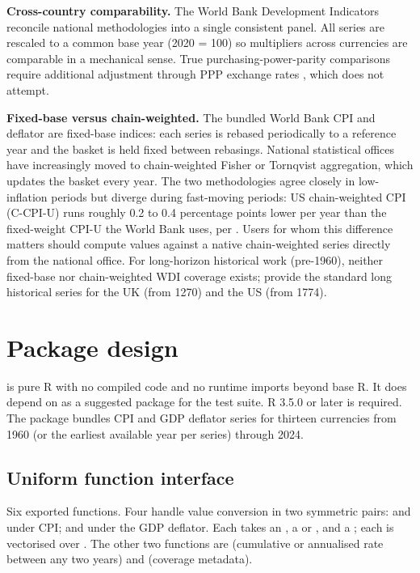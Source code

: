 \textbf{Cross-country comparability.} The World Bank Development
Indicators reconcile national methodologies into a single
consistent panel. All series are rescaled to a common base year
(2020 = 100) so multipliers across currencies are comparable in a
mechanical sense. True purchasing-power-parity comparisons require
additional adjustment through PPP exchange rates
\citep{deaton2010price}, which  does not attempt.

\textbf{Fixed-base versus chain-weighted.} The bundled World Bank CPI
and deflator are fixed-base indices: each series is rebased
periodically to a reference year and the basket is held fixed
between rebasings. National statistical offices have increasingly
moved to chain-weighted Fisher or Tornqvist aggregation, which
updates the basket every year. The two methodologies agree closely
in low-inflation periods but diverge during fast-moving periods:
US chain-weighted CPI (C-CPI-U) runs roughly 0.2 to 0.4 percentage
points lower per year than the fixed-weight CPI-U the World Bank
uses, per \citet{moulton2018measurement}. Users for whom this difference
matters should compute values against a native chain-weighted
series directly from the national office. For long-horizon
historical work (pre-1960), neither fixed-base nor chain-weighted
WDI coverage exists; \citet{officer2024measuringworth} provide the
standard long historical series for the UK (from 1270) and the US
(from 1774).

\section{Package design}\label{package-design}

 is pure R with no compiled code and no runtime
imports beyond base R. It does depend on  as a
suggested package for the test suite. R 3.5.0 or later is required.
The package bundles CPI and GDP deflator series for thirteen
currencies from 1960 (or the earliest available year per series)
through 2024.

\subsection{Uniform function interface}\label{uniform-function-interface}

Six exported functions. Four handle value conversion in two
symmetric pairs:  and
 under CPI;  and
 under the GDP deflator. Each takes an
, a  or , and a
; each is vectorised over . The other
two functions are  (cumulative or
annualised rate between any two years) and
 (coverage metadata).

